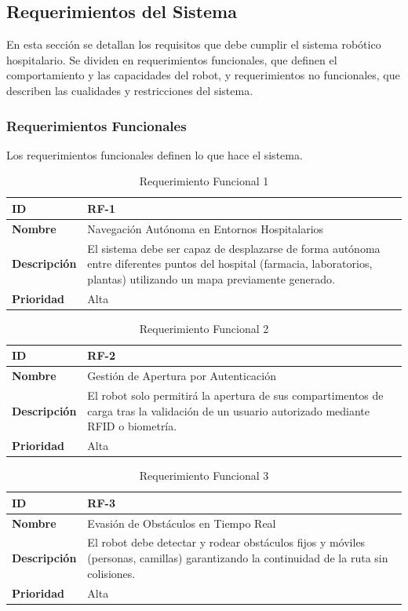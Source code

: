 \subsection{Requerimientos del Sistema}
En esta sección se detallan los requisitos que debe cumplir el sistema robótico hospitalario. Se dividen en requerimientos funcionales, que definen el comportamiento y las capacidades del robot, y requerimientos no funcionales, que describen las cualidades y restricciones del sistema.

\subsubsection{Requerimientos Funcionales}
Los requerimientos funcionales definen lo que hace el sistema.

\begin{table}[H]
\centering
\begin{tabular}{|l|p{10cm}|}
\hline
\textbf{ID} & RF-1 \\ \hline
\textbf{Nombre} & Navegación Autónoma en Entornos Hospitalarios \\ \hline
\textbf{Descripción} & El sistema debe ser capaz de desplazarse de forma autónoma entre diferentes puntos del hospital (farmacia, laboratorios, plantas) utilizando un mapa previamente generado. \\ \hline
\textbf{Prioridad} & Alta \\ \hline
\end{tabular}
\caption{Requerimiento Funcional 1}
\end{table}

\begin{table}[H]
\centering
\begin{tabular}{|l|p{10cm}|}
\hline
\textbf{ID} & RF-2 \\ \hline
\textbf{Nombre} & Gestión de Apertura por Autenticación \\ \hline
\textbf{Descripción} & El robot solo permitirá la apertura de sus compartimentos de carga tras la validación de un usuario autorizado mediante RFID o biometría. \\ \hline
\textbf{Prioridad} & Alta \\ \hline
\end{tabular}
\caption{Requerimiento Funcional 2}
\end{table}

\begin{table}[H]
\centering
\begin{tabular}{|l|p{10cm}|}
\hline
\textbf{ID} & RF-3 \\ \hline
\textbf{Nombre} & Evasión de Obstáculos en Tiempo Real \\ \hline
\textbf{Descripción} & El robot debe detectar y rodear obstáculos fijos y móviles (personas, camillas) garantizando la continuidad de la ruta sin colisiones. \\ \hline
\textbf{Prioridad} & Alta \\ \hline
\end{tabular}
\caption{Requerimiento Funcional 3}
\end{table}

